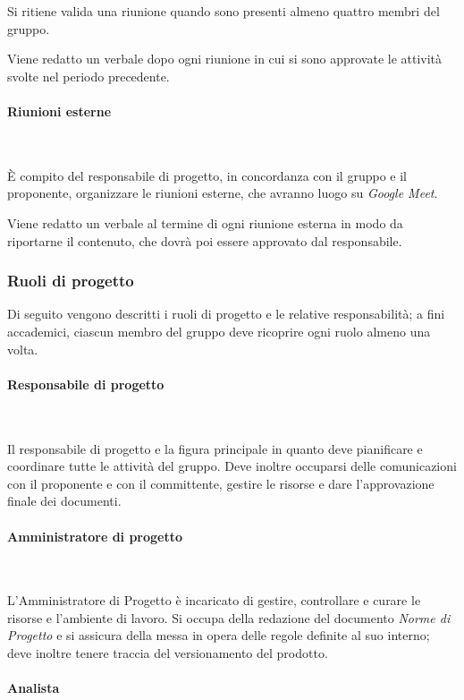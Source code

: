        Si ritiene valida una riunione quando sono presenti almeno quattro membri del gruppo.

        Viene redatto un verbale dopo ogni riunione in cui si sono approvate le attività svolte nel periodo precedente.

        \paragraph{Riunioni esterne}~

        \noindent È compito del responsabile di progetto, in concordanza con il gruppo e il proponente, organizzare le riunioni esterne, che avranno luogo su \textit{Google Meet}.

        Viene redatto un verbale al termine di ogni riunione esterna in modo da riportarne il contenuto, che dovrà poi essere approvato dal responsabile.
        \subsubsection{Ruoli di progetto}
        Di seguito vengono descritti i ruoli di progetto e le relative responsabilità; a fini accademici, ciascun membro del gruppo deve ricoprire ogni ruolo almeno una volta.

        \paragraph{Responsabile di progetto} ~

        \noindent Il responsabile di progetto e la figura principale in quanto deve pianificare e coordinare tutte le attività del gruppo. Deve inoltre occuparsi delle comunicazioni con il proponente e con il committente, gestire le risorse e dare l'approvazione finale dei documenti.

        \paragraph{Amministratore di progetto} ~

        \noindent L'Amministratore di Progetto è incaricato di gestire, controllare e curare le risorse e l'ambiente di lavoro. Si occupa della redazione del documento \textit{Norme di Progetto} e si assicura della messa in opera delle regole definite al suo interno; deve inoltre tenere traccia del versionamento del prodotto.

        \paragraph{Analista} ~

